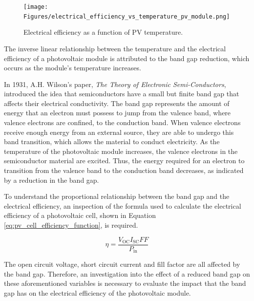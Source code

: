 \begin{figure}[ht]
    \centering
    \texttt{[image: Figures/electrical\_efficiency\_vs\_temperature\_pv\_module.png]}
    \caption{Electrical efficiency as a function of PV temperature. \cite{Teo2012AnModules}}
    \label{fig:electrical_efficiency_vs_temperature_pv_module}
\end{figure}
\FloatBarrier

The inverse linear relationship between the temperature and the electrical efficiency of a photovoltaic module is attributed to the band gap reduction, which occurs as the module's temperature increases.\vspace{0.5em}

In 1931, A.H. Wilson's paper, \textit{The Theory of Electronic Semi-Conductors}, introduced the idea that semiconductors have a small but finite band gap that affects their electrical conductivity. \cite{Il1931TheSemi-Conductors} The band gap represents the amount of energy that an electron must possess to jump from the valence band, where valence electrons are confined, to the conduction band. When valence electrons receive enough energy from an external source, they are able to undergo this band transition, which allows the material to conduct electricity. \cite{CircuitBread2018BandElectronics} As the temperature of the photovoltaic module increases, the valence electrons in the semiconductor material are excited. Thus, the energy required for an electron to transition from the valence band to the conduction band decreases, as indicated by a reduction in the band gap. \cite{Renewable_Tek2025HOTExplained}\vspace{0.5em}

To understand the proportional relationship between the band gap and the electrical efficiency, an inspection of the formula used to calculate the electrical efficiency of a photovoltaic cell, shown in Equation \ref{eq:pv_cell_efficiency_function}, is required. \cite{HonsbergSolarEfficiency}

\begin{equation}
    \eta = \frac{V_\text{OC}I_\text{SC}FF}{P_\text{in}}
    \label{eq:pv_cell_efficiency_function}
\end{equation}

The open circuit voltage, short circuit current and fill factor are all affected by the band gap. Therefore, an investigation into the effect of a reduced band gap on these aforementioned variables is necessary to evaluate the impact that the band gap has on the electrical efficiency of the photovoltaic module.\vspace{0.5em}

